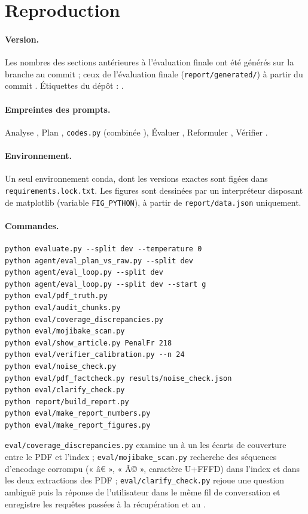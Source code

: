 \section{Reproduction}\label{sec:repro}

\paragraph{Version.} Les nombres des sections antérieures à l'évaluation finale ont été générés sur la branche \NGitBranch{} au
commit \NGitHead ; ceux de l'évaluation finale (\texttt{report/generated/}) à partir du commit \EvGitHead. Étiquettes du dépôt :
\NGitTags.

\paragraph{Empreintes des prompts.} Analyse \NHashAnalyze, Plan \NHashPlan, \texttt{codes.py} \NHashCodes{} (combinée
\NHashCombined), Évaluer \NHashGrade, Reformuler \NHashReformulate, Vérifier \NHashVerify.

\paragraph{Environnement.} Un seul environnement conda, dont les versions exactes sont figées dans
\texttt{requirements.lock.txt}. Les figures sont dessinées par un interpréteur disposant de matplotlib (variable
\texttt{FIG\_PYTHON}), à partir de \texttt{report/data.json} uniquement.

\paragraph{Commandes.}
\begin{lstlisting}
python evaluate.py --split dev --temperature 0
python agent/eval_plan_vs_raw.py --split dev
python agent/eval_loop.py --split dev
python agent/eval_loop.py --split dev --start g
python eval/pdf_truth.py
python eval/audit_chunks.py
python eval/coverage_discrepancies.py
python eval/mojibake_scan.py
python eval/show_article.py PenalFr 218
python eval/verifier_calibration.py --n 24
python eval/noise_check.py
python eval/pdf_factcheck.py results/noise_check.json
python eval/clarify_check.py
python report/build_report.py
python eval/make_report_numbers.py
python eval/make_report_figures.py
\end{lstlisting}
\texttt{eval/coverage\_discrepancies.py} examine un à un les écarts de couverture entre le PDF et l'index ;
\texttt{eval/mojibake\_scan.py} recherche des séquences d'encodage corrompu (« â€ », « Ã© », caractère U+FFFD) dans
l'index et dans les deux extractions des PDF ; \texttt{eval/clarify\_check.py} rejoue une question ambiguë puis la
réponse de l'utilisateur dans le même fil de conversation et enregistre les requêtes passées à la récupération et au
.

